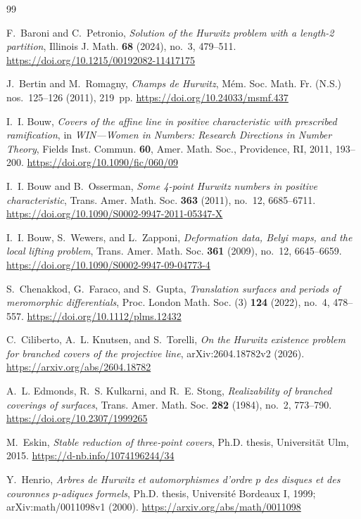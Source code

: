 \documentclass[11pt]{amsart}
\theoremstyle{plain}
\theoremstyle{definition}
\numberwithin{equation}{section}
\begin{document}
\sloppy
\begin{thebibliography}{99}
\raggedright

F.~Baroni and C.~Petronio,
\emph{Solution of the Hurwitz problem with a length-2 partition},
Illinois J. Math. \textbf{68} (2024), no.~3, 479--511.
\url{https://doi.org/10.1215/00192082-11417175}

J.~Bertin and M.~Romagny,
\emph{Champs de Hurwitz},
M\'em. Soc. Math. Fr. (N.S.) nos.~125--126 (2011), 219~pp.
\url{https://doi.org/10.24033/msmf.437}

I.~I. Bouw,
\emph{Covers of the affine line in positive characteristic with prescribed
ramification},
in \emph{WIN---Women in Numbers: Research Directions in Number Theory},
Fields Inst. Commun. \textbf{60}, Amer. Math. Soc., Providence, RI, 2011,
193--200.
\url{https://doi.org/10.1090/fic/060/09}

I.~I. Bouw and B.~Osserman,
\emph{Some 4-point Hurwitz numbers in positive characteristic},
Trans. Amer. Math. Soc. \textbf{363} (2011), no.~12, 6685--6711.
\url{https://doi.org/10.1090/S0002-9947-2011-05347-X}

I.~I. Bouw, S.~Wewers, and L.~Zapponi,
\emph{Deformation data, Belyi maps, and the local lifting problem},
Trans. Amer. Math. Soc. \textbf{361} (2009), no.~12, 6645--6659.
\url{https://doi.org/10.1090/S0002-9947-09-04773-4}

S.~Chenakkod, G.~Faraco, and S.~Gupta,
\emph{Translation surfaces and periods of meromorphic differentials},
Proc. London Math. Soc. (3) \textbf{124} (2022), no.~4, 478--557.
\url{https://doi.org/10.1112/plms.12432}

C.~Ciliberto, A.~L. Knutsen, and S.~Torelli,
\emph{On the Hurwitz existence problem for branched covers of the projective
line},
arXiv:2604.18782v2 (2026).
\url{https://arxiv.org/abs/2604.18782}

A.~L. Edmonds, R.~S. Kulkarni, and R.~E. Stong,
\emph{Realizability of branched coverings of surfaces},
Trans. Amer. Math. Soc. \textbf{282} (1984), no.~2, 773--790.
\url{https://doi.org/10.2307/1999265}

M.~Eskin,
\emph{Stable reduction of three-point covers},
Ph.D. thesis, Universit\"at Ulm, 2015.
\url{https://d-nb.info/1074196244/34}

Y.~Henrio,
\emph{Arbres de Hurwitz et automorphismes d'ordre $p$ des disques et des
couronnes $p$-adiques formels},
Ph.D. thesis, Universit\'e Bordeaux I, 1999;
arXiv:math/0011098v1 (2000).
\url{https://arxiv.org/abs/math/0011098}


\end{thebibliography}
\end{document}
